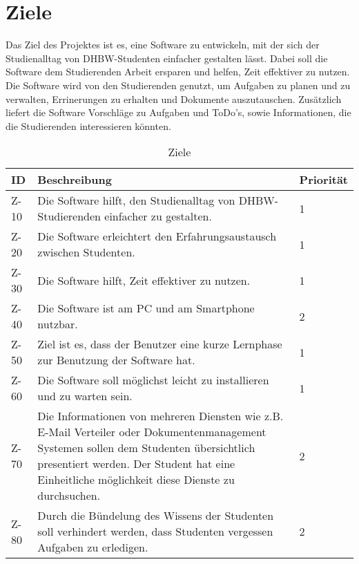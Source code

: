 
\chapter{Ziele}
Das Ziel des Projektes ist es, eine Software zu entwickeln, mit der sich der Studienalltag von DHBW-Studenten einfacher gestalten lässt. Dabei soll die Software dem Studierenden Arbeit ersparen und helfen, Zeit effektiver zu nutzen. Die Software wird von den Studierenden genutzt, um  Aufgaben zu planen und zu verwalten, Errinerungen zu erhalten und Dokumente auszutauschen. Zusätzlich liefert die Software Vorschläge zu Aufgaben und ToDo's, sowie Informationen, die die Studierenden interessieren könnten. 

\begin{table}[H]
\caption{Ziele}
\label{ziele:entwicklungsziele}
\begin{tabularx}{\textwidth}{|l|X|l|}
\toprule
\textbf{ID} & \textbf{Beschreibung} & \textbf{Priorität}\\
\endhead
\hline
Z-10 & Die Software hilft, den Studienalltag von DHBW-Studierenden einfacher zu gestalten. & 1 \\
Z-20 & Die Software erleichtert den Erfahrungsaustausch zwischen Studenten. & 1 \\
Z-30 & Die Software hilft, Zeit effektiver zu nutzen. & 1\\
Z-40 & Die Software ist am PC und am Smartphone nutzbar. & 2\\
Z-50 & Ziel ist es, dass der Benutzer eine kurze Lernphase zur Benutzung der Software hat. & 1 \\
Z-60 & Die Software soll möglichst leicht zu installieren und zu warten sein. & 1 \\
Z-70 & Die Informationen von mehreren Diensten wie z.B. E-Mail Verteiler oder Dokumentenmanagement Systemen sollen dem Studenten übersichtlich presentiert werden. Der Student hat eine Einheitliche möglichkeit diese Dienste zu durchsuchen. & 2 \\
Z-80 & Durch die Bündelung des Wissens der Studenten soll verhindert werden, dass Studenten vergessen Aufgaben zu erledigen. & 2 \\
\hline
\end{tabularx}
\end{table}
